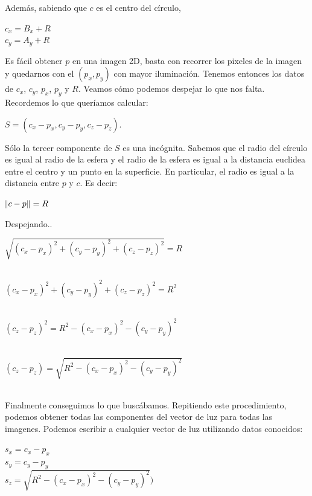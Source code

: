Además, sabiendo que $c$ es el centro del círculo,

\begin{center}
    $c_{x} = B_x + R$ \\
    $c_{y} = A_y + R$
\end{center}

Es fácil obtener $p$ en una imagen 2D, basta con recorrer los pixeles de la imagen y quedarnos con el $(p_x, p_y)$ con mayor iluminación. Tenemos entonces los datos de $c_x$, $c_y$, $p_x$, $p_y$ y $R$. Veamos cómo podemos despejar lo que nos falta. \\

Recordemos lo que queríamos calcular:
\begin{center}
    $S = (c_{x} - p_{x}, c_{y} - p_{y}, c_{z} - p_{z}).$
\end{center}

Sólo la tercer componente de $S$ es una incógnita. Sabemos que el radio del círculo es igual al radio de la esfera y el radio de la esfera es igual a la distancia euclidea entre el centro y un punto en la superficie. En particular, el radio es igual a la distancia entre $p$ y $c$. Es decir:

\begin{center}
    $\norm{c - p} = R$ \\
\end{center}

Despejando..

\begin{center}
    $\sqrt{(c_{x} - p_{x})^{2} + (c_{y} - p_{y})^{2} + (c_{z} - p_{z})^{2}} = R$ \\ $ $

    $(c_{x} - p_{x})^{2} + (c_{y} - p_{y})^{2} + (c_{z} - p_{z})^{2} = R^{2}$ \\ $ $

    $(c_{z} - p_{z})^{2} = R^{2} - (c_{x} - p_{x})^{2} - (c_{y} - p_{y})^{2}$ \\ $ $

    $(c_{z} - p_{z}) = \sqrt{R^{2} - (c_{x} - p_{x})^{2} - (c_{y} - p_{y})^{2}}$ \\ $ $

\end{center}

Finalmente conseguimos lo que buscábamos. Repitiendo este procedimiento, podemos obtener todas las componentes del vector de luz para todas las imagenes. Podemos escribir a cualquier vector de luz utilizando datos conocidos:

\begin{center}
    $s_x = c_{x} - p_{x}$ \\
    $s_y = c_{y} - p_{y}$ \\
    $s_z = \sqrt{R^{2} - (c_{x} - p_{x})^{2} - (c_{y} - p_{y})^{2}})$ \\
\end{center}

